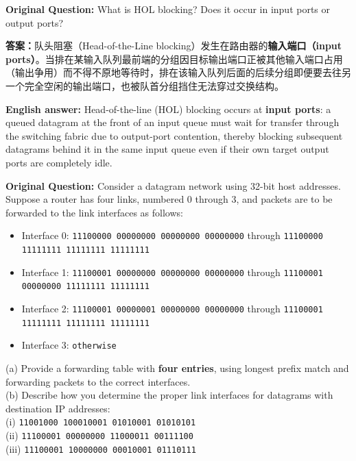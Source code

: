 
\textbf{Original Question:} What is HOL blocking? Does it occur in input ports or output ports?

\textbf{答案：}队头阻塞（Head-of-the-Line blocking）发生在路由器的\textbf{输入端口（input ports）}。当排在某输入队列最前端的分组因目标输出端口正被其他输入端口占用（输出争用）而不得不原地等待时，排在该输入队列后面的后续分组即便要去往另一个完全空闲的输出端口，也被队首分组挡住无法穿过交换结构。

\textbf{English answer:} Head-of-the-line (HOL) blocking occurs at \textbf{input ports}: a queued datagram at the front of an input queue must wait for transfer through the switching fabric due to output-port contention, thereby blocking subsequent datagrams behind it in the same input queue even if their own target output ports are completely idle.



\textbf{Original Question:} Consider a datagram network using 32-bit host addresses. Suppose a router has four links, numbered 0 through 3, and packets are to be forwarded to the link interfaces as follows:
\begin{itemize}
\item Interface 0: \texttt{11100000 00000000 00000000 00000000} through \texttt{11100000 11111111 11111111 11111111}
\item Interface 1: \texttt{11100001 00000000 00000000 00000000} through \texttt{11100001 00000000 11111111 11111111}
\item Interface 2: \texttt{11100001 00000001 00000000 00000000} through \texttt{11100001 11111111 11111111 11111111}
\item Interface 3: \texttt{otherwise}
\end{itemize}
(a) Provide a forwarding table with \textbf{four entries}, using longest prefix match and forwarding packets to the correct interfaces. \\
(b) Describe how you determine the proper link interfaces for datagrams with destination IP addresses: \\
(i) \texttt{11001000 100010001 01010001 01010101} \\
(ii) \texttt{11100001 00000000 11000011 00111100} \\
(iii) \texttt{11100001 10000000 00010001 01110111}

